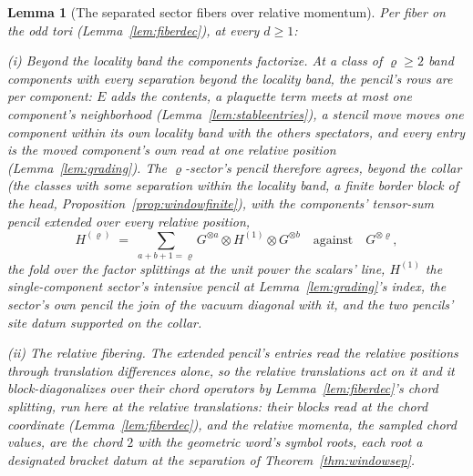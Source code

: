 \documentclass[11pt]{article}
\newtheorem{lemma}{Lemma}
\theoremstyle{definition}
\begin{document}
\begin{lemma}[The separated sector fibers over relative momentum]
\label{lem:relfiber}
Per fiber on the odd tori (Lemma~\ref{lem:fiberdec}), at every $d\ge1$:

\emph{(i) Beyond the locality band the components factorize.} At a class of
$\varrho\ge2$ band components with every separation beyond the locality band,
the pencil's rows are per component: $E$ adds the contents, a plaquette
term meets at most one component's neighborhood
(Lemma~\ref{lem:stableentries}), a stencil
move moves one component within its own locality band with the others
spectators, and every entry is the moved component's own read at one
relative position (Lemma~\ref{lem:grading}). The $\varrho$-sector's pencil
therefore agrees, beyond the \emph{collar} (the classes with some
separation within the locality band, a finite border block of the head,
Proposition~\ref{prop:windowfinite}), with the components' tensor-sum
pencil extended over every relative position,
\[
H^{(\varrho)}\;=\;\sum_{a+b+1=\varrho}G^{\otimes a}\otimes H^{(1)}\otimes
G^{\otimes b}
\quad\text{against}\quad G^{\otimes \varrho} ,
\]
the fold over the factor splittings at the unit power the scalars'
line,
$H^{(1)}$ the single-component sector's intensive pencil at
Lemma~\ref{lem:grading}'s index, the sector's own pencil the join of
the vacuum diagonal with it, and the two pencils' site datum
supported on the
collar.

\emph{(ii) The relative fibering.} The extended pencil's entries read
the relative positions through translation differences alone, so the
relative translations act on it and it block-diagonalizes over their
chord operators by
Lemma~\ref{lem:fiberdec}'s chord splitting, run here at the relative
translations: their blocks
read at the chord coordinate (Lemma~\ref{lem:fiberdec}), and the
\emph{relative momenta}, the sampled chord values, are the chord $2$
with the geometric word's symbol roots, each
root a designated bracket datum at the separation of
Theorem~\ref{thm:windowsep}.


\end{lemma}
\end{document}

